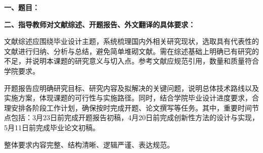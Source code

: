 {
    \setlength{\parindent}{0em}
    \par {\bfseries 一、题目：\Title}
    \\
    \par {\bfseries 二、指导教师对文献综述、开题报告、外文翻译的具体要求：}
    \setlength{\parindent}{2em}
	\setlength{\parskip}{1em}
	\par       文献综述应围绕毕业设计主题，系统梳理国内外相关研究现状，选取具有代表性的文献进行归纳、分析与总结，避免简单堆砌文献。需在综述基础上明确已有研究的不足，并说明本课题的研究意义与切入点。参考文献应规范引用，数量和质量符合学院要求。
	\setlength{\parskip}{0em} 
	\par       开题报告应明确研究目标、研究内容及拟解决的关键问题，说明总体技术路线以及实施方案，体现课题的可行性与实施路径。同时，结合学院毕业设计进度要求，合理安排各阶段工作计划，确保按时完成开题、论文撰写等任务。其中，重要时间节点包括：3月23日前完成开题报告初稿，4月20日前完成创新性方法的设计与实现，5月11日前完成毕业论文初稿。
	\par       整体要求内容完整、结构清晰、逻辑严谨、表达规范。
}

\mbox{} \vfill

\signature{指导教师（签名）}
